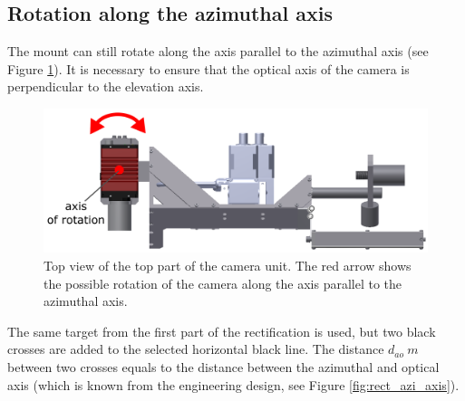 \subsection{Rotation along the azimuthal axis}

The mount can still rotate along the axis parallel to the azimuthal axis (see Figure \ref{fig:rect_model_top_view}). It is necessary to ensure that the optical axis of the camera is perpendicular to the elevation axis. 

\begin{figure}[htb]
	\centering
	\includegraphics[width=13cm]{fig/rect_model_top_view.png}
	\caption{Top view of the top part of the camera unit. The red arrow shows the possible rotation of the camera along the axis parallel to the azimuthal axis.}
	\label{fig:rect_model_top_view}
\end{figure}

The same target from the first part of the rectification is used, but two black crosses are added to the selected horizontal black line. The distance $d_{ao}\ m$ between two crosses equals to the distance between the azimuthal and optical axis (which is known from the engineering design, see Figure \ref{fig:rect_azi_axis}). 

